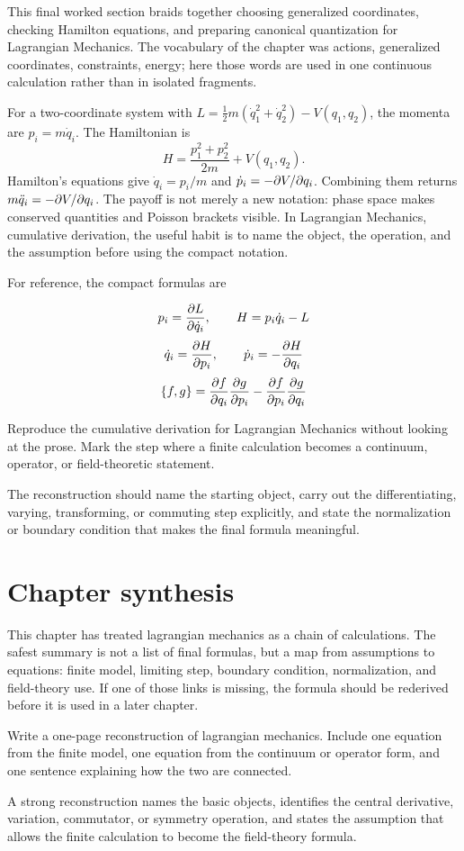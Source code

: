 This final worked section braids together choosing generalized coordinates, checking Hamilton equations, and preparing canonical quantization for Lagrangian Mechanics.  The vocabulary of the chapter was actions, generalized coordinates, constraints, energy; here those words are used in one continuous calculation rather than in isolated fragments.

For a two-coordinate system with \(L=\frac12m(\dot q_1^2+\dot q_2^2)-V(q_1,q_2)\), the momenta are \(p_i=m\dot q_i\).  The Hamiltonian is
\[
  H=\frac{p_1^2+p_2^2}{2m}+V(q_1,q_2).
\]
Hamilton's equations give \(\dot q_i=p_i/m\) and \(\dot p_i=-\partial V/\partial q_i\).  Combining them returns \(m\ddot q_i=-\partial V/\partial q_i\).  The payoff is not merely a new notation: phase space makes conserved quantities and Poisson brackets visible.  In Lagrangian Mechanics, cumulative derivation, the useful habit is to name the object, the operation, and the assumption before using the compact notation.

For reference, the compact formulas are

\[
  p_i=\frac{\partial L}{\partial\dot q_i},\qquad H=p_i\dot q_i-L
\]
\[
  \dot q_i=\frac{\partial H}{\partial p_i},\qquad \dot p_i=-\frac{\partial H}{\partial q_i}
\]
\[
  \{f,g\}=\frac{\partial f}{\partial q_i}\frac{\partial g}{\partial p_i}-\frac{\partial f}{\partial p_i}\frac{\partial g}{\partial q_i}
\]

\begin{exercise}
Reproduce the cumulative derivation for Lagrangian Mechanics without looking at the prose.  Mark the step where a finite calculation becomes a continuum, operator, or field-theoretic statement.
\begin{answer}
The reconstruction should name the starting object, carry out the differentiating, varying, transforming, or commuting step explicitly, and state the normalization or boundary condition that makes the final formula meaningful.
\end{answer}
\end{exercise}



\section{Chapter synthesis}

This chapter has treated lagrangian mechanics as a chain of calculations.  The safest summary is not a list of final formulas, but a map from assumptions to equations: finite model, limiting step, boundary condition, normalization, and field-theory use.  If one of those links is missing, the formula should be rederived before it is used in a later chapter.

\begin{exercise}
Write a one-page reconstruction of lagrangian mechanics.  Include one equation from the finite model, one equation from the continuum or operator form, and one sentence explaining how the two are connected.
\begin{answer}
A strong reconstruction names the basic objects, identifies the central derivative, variation, commutator, or symmetry operation, and states the assumption that allows the finite calculation to become the field-theory formula.
\end{answer}
\end{exercise}
